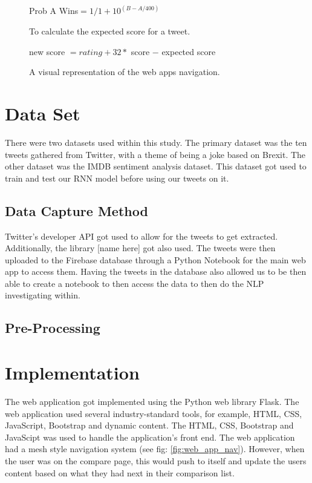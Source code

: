 	
	\begin{figure}[t]
		\centering
		 Prob A Wins$ = 1/1+10^{(B-A/400)}$
		\caption{To calculate the expected score for a tweet.}
		\label{fig:elo_maths_1}
	\end{figure}

\begin{figure}[t]
	\centering

	new score $= rating + 32 * $  score $ - $ expected score
	\caption{A visual representation of the web apps navigation.}
	\label{fig:elo_maths_2}
\end{figure}
	
	\section{Data Set}
	There were two datasets used within this study. The primary dataset was the ten tweets gathered from Twitter, with a theme of being a joke based on Brexit. The other dataset was the IMDB sentiment analysis dataset. This dataset got used to train and test our RNN model before using our tweets on it. 
	
	\subsection{Data Capture Method}
	Twitter's developer API got used to allow for the tweets to get extracted. Additionally, the library [name here] got also used. The tweets were then uploaded to the Firebase database through a Python Notebook for the main web app to access them. Having the tweets in the database also allowed us to be then able to create a notebook to then access the data to then do the NLP investigating within.
	
	\subsection{Pre-Processing}
	
	
	
	
	\section{Implementation}
	
	The web application got implemented using the Python web library Flask. The web application used several industry-standard tools, for example, HTML, CSS, JavaScript, Bootstrap and dynamic content. The HTML, CSS, Bootstrap and JavaScipt was used to handle the application's front end. The web application had a mesh style navigation system (see fig: \ref{fig:web_app_nav}). However, when the user was on the compare page, this would push to itself and update the users content based on what they had next in their comparison list.
	
